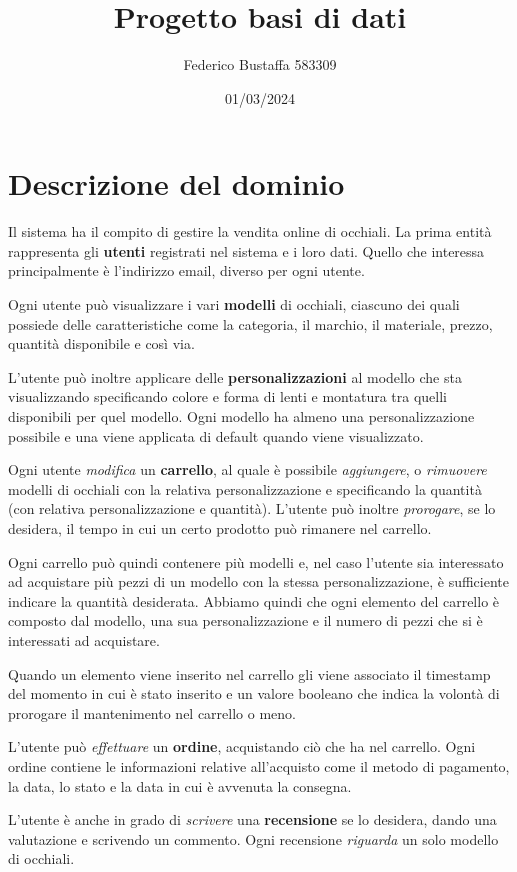 \documentclass[12pt, a4paper]{article}
\title{Progetto basi di dati}
\author{Federico Bustaffa 583309}
\date{01/03/2024}
\begin{document}
\maketitle
\tableofcontents

\section{Descrizione del dominio}
Il sistema ha il compito di gestire la vendita online di occhiali. La prima entità rappresenta
gli \textbf{utenti} registrati nel sistema e i loro dati. Quello che interessa principalmente
è l'indirizzo email, diverso per ogni utente.

Ogni utente può visualizzare i vari \textbf{modelli} di occhiali, ciascuno dei quali possiede
delle caratteristiche come la categoria, il marchio, il materiale, prezzo, quantità disponibile
e così via.

L'utente può inoltre applicare delle \textbf{personalizzazioni} al modello che sta visualizzando
specificando colore e forma di lenti e montatura tra quelli disponibili per quel modello. Ogni
modello ha almeno una personalizzazione possibile e una viene applicata di default quando viene
visualizzato.

Ogni utente \emph{modifica} un \textbf{carrello}, al quale è possibile \emph{aggiungere}, o
\emph{rimuovere} modelli di occhiali con la relativa personalizzazione e specificando la quantità
(con relativa personalizzazione e quantità). L'utente può inoltre \emph{prorogare}, se lo desidera,
il tempo in cui un certo prodotto può rimanere nel carrello.

Ogni carrello può quindi contenere più modelli e, nel caso l'utente sia interessato ad acquistare
più pezzi di un modello con la stessa personalizzazione, è sufficiente indicare la quantità
desiderata. Abbiamo quindi che ogni elemento del carrello è composto dal modello, una sua
personalizzazione e il numero di pezzi che si è interessati ad acquistare.

Quando un elemento viene inserito nel carrello gli viene associato il timestamp del momento in cui
è stato inserito e un valore booleano che indica la volontà di prorogare il mantenimento nel
carrello o meno.

L'utente può \emph{effettuare} un \textbf{ordine}, acquistando ciò che ha nel carrello.
Ogni ordine contiene le informazioni relative all'acquisto come il metodo di pagamento, la data,
lo stato e la data in cui è avvenuta la consegna.

L'utente è anche in grado di \emph{scrivere} una \textbf{recensione} se lo desidera, dando una
valutazione e scrivendo un commento. Ogni recensione \emph{riguarda} un solo modello di occhiali.
\end{document}
